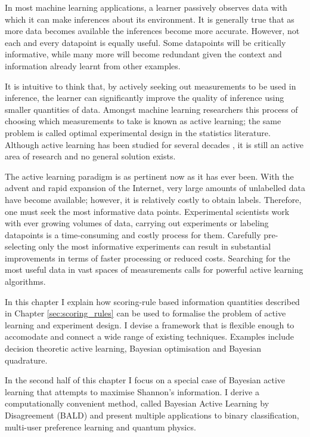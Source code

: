 
In most machine learning applications, a learner passively observes data with which it can make inferences about its environment. It is generally true that as more data becomes available the inferences become more accurate. However, not each and every datapoint is equally useful. Some datapoints will be critically informative, while many more will become redundant given the context and information already learnt from other examples.

It is intuitive to think that, by actively seeking out measurements to be used in inference, the learner can significantly improve the quality of inference using smaller quantities of data. Amongst machine learning researchers this process of choosing which measurements to take is known as active learning; the same problem is called optimal experimental design in the statistics literature. Although active learning has been studied for several decades \citep{lindley1956,jaynes1986}, it is still an active area of research and no general solution exists.

The active learning paradigm is as pertinent now as it has ever been. With the advent and rapid expansion of the Internet, very large amounts of unlabelled data have become available; however, it is relatively costly to obtain labels. Therefore, one must seek the most informative data points. Experimental scientists work with ever growing volumes of data, carrying out experiments or labeling datapoints is a time-consuming and costly process for them. Carefully pre-selecting only the most informative experiments can result in substantial improvements in terms of faster processing or reduced costs. Searching for the most useful data in vast spaces of measurements calls for powerful active learning algorithms.

In this chapter I explain how scoring-rule based information quantities described in Chapter \ref{sec:scoring_rules} can be used to formalise the problem of active learning and experiment design. I devise a framework that is flexible enough to accomodate and connect a wide range of existing techniques. Examples include decision theoretic active learning, Bayesian optimisation and Bayesian quadrature.

In the second half of this chapter I focus on a special case of Bayesian active learning that attempts to maximise Shannon's information. I derive a computationally convenient method, called Bayesian Active Learning by Disagreement (BALD) and present multiple applications to binary classification, multi-user preference learning and quantum physics.

